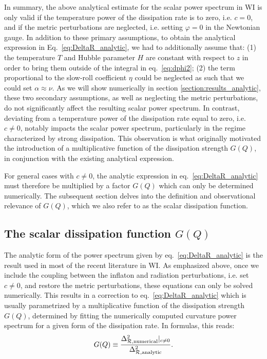 \documentclass[a4paper,11pt]{article}
\begin{document}
In summary, the above analytical estimate for the scalar power spectrum in WI is only valid if the temperature power of the dissipation rate is to zero, i.e. $c = 0$, and if the
metric perturbations are neglected, i.e. setting $\varphi=0$ in the Newtonian gauge. In addition to these primary assumptions, to obtain the analytical expression in Eq.~\eqref{eq:DeltaR_analytic}, we had to additionally assume that: (1) the temperature $T$ and Hubble parameter $H$ are constant with respect to $z$ in order to bring them outside of the integral in eq.~\eqref{eq:dphi2}; (2) the term proportional to the slow-roll coefficient $\eta$ could be neglected as such that we could set $\alpha\approx\nu$. As we will show numerically in section \ref{section:results_analytic}, these two secondary assumptions, as well as neglecting the metric perturbations, do not significantly affect the resulting scalar power spectrum. In contrast, deviating from a temperature power of the dissipation rate equal to zero, i.e. $c\neq 0$, notably impacts the scalar power spectrum, particularly in the regime characterized by strong dissipation. This observation is what originally motivated the introduction of a multiplicative function of the dissipation strength $G(Q)$, in conjunction with the existing analytical expression. 

For general cases with $c \neq 0$, the analytic expression in eq.~\eqref{eq:DeltaR_analytic} must therefore be multiplied by a factor $G(Q)$
which can only be determined numerically.
The subsequent section delves into the definition and observational relevance of $G(Q)$, which we also refer to as the scalar dissipation function. 





\subsection{The scalar dissipation function $G(Q)$ \label{sec:GQ_def}}

The analytic form of the power spectrum given by eq.~\eqref{eq:DeltaR_analytic} is the result used in most of the recent literature in WI. As emphasized above, once we include the coupling between the inflaton and
radiation perturbations, i.e. set $c\neq 0$, and restore the metric perturbations, these equations can only be solved numerically. This results in a correction to eq.~\eqref{eq:DeltaR_analytic} which is usually parametrized by a multiplicative function
of the dissipation strength $G(Q)$, determined by fitting the
numerically computed curvature power spectrum for a
given form of the dissipation rate. In formulas, this reads:
\begin{equation}
    G(Q)\equiv \frac{\Delta_{\mathcal{R},\rm{numerical}}^2|_{c\neq 0}}{\Delta_{\mathcal{R},\rm{analytic}}^2}. \label{eq:GQ_definition}
\end{equation}
\end{document}
